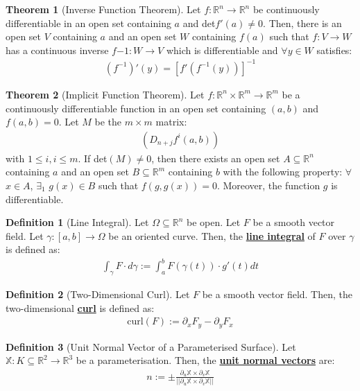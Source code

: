 \documentclass[11pt]{scrartcl}
\newcommand{\R}[0]{\mathbb{R}}
\theoremstyle{definition}
\newtheorem{theorem}{Theorem}
\newtheorem{definition}{Definition}
\theoremstyle{remark}
\newcommand{\dfn}[1]{\textbf{\underline{#1}}}
\newcommand{\idx}[2]{\int_{#1}^{#2}}
\begin{document}
{\begin{theorem}[Inverse Function Theorem]
	Let $f: \R^n \rightarrow \R^n$ be continuously differentiable in an open set containing $a$ and det$f'(a) \neq 0$. Then, there is an open set $V$ containing $a$ and an open set $W$  containing $f(a)$ such that $f: V \rightarrow W$ has a continuous inverse $f{-1}: W \rightarrow V$ which is differentiable and $\forall y \in W$ satisfies: 
	\begin{align}
		(f^{-1})'(y) = [ f'(f^{-1}(y))]^{-1} 	
	\end{align}
\end{theorem}

\begin{theorem}[Implicit Function Theorem]
	Let $f: \R^n \times \R^m \rightarrow \R^m$ be a continuously differentiable function in an open set containing $(a,b)$ and $f(a,b) =0$. Let $M$ be the $m \times m$ matrix: 
	\begin{align*}
		(D_{n+j}f^i (a,b)) 
	\end{align*}
	with $1 \leq i, i \leq m$. If det$(M) \neq 0 $, then there exists an open set $A \subseteq \R^n$ containing $a$ and an open set $B \subseteq \R^m$ containing $b$ with the following property: $\forall$ $ x \in A$, $\exists_1$ $g(x) \in B$ such that $f(g, g(x) ) =0$. Moreover, the function $g$ is differentiable. 
\end{theorem} 	


\begin{definition}[Line Integral]
	Let $\Omega \subseteq \R^n$ be open. Let $F$ be a smooth vector field. Let $\gamma: [a,b] \rightarrow \Omega$ be an oriented curve. Then, the \dfn{line integral} of $F$ over $\gamma$ is defined as: 
	\begin{align*}
		\idx{\gamma}{} F \cdot d\gamma := \idx{a}{b} F(\gamma(t)) \cdot g'(t) dt 
	\end{align*}
\end{definition}

\begin{definition}[Two-Dimensional Curl]
	Let $F$ be a smooth vector field. Then, the two-dimensional \dfn{curl} is defined as: 
	\begin{align*}
		\text{curl} (F) := \partial_x F_y - \partial_y F_x 
	\end{align*}
\end{definition}


\begin{definition}[Unit Normal Vector of a Parameterised Surface] 
	Let $\mathbb{X}: K \subseteq \R^2 \rightarrow \R^3$ be a parameterisation. Then, the \dfn{unit normal vectors} are: 
	\begin{align*}
		n := \pm \frac{\partial_u \mathbb{X} \times \partial_v \mathbb{X}}{|| \partial_u \mathbb{X} \times \partial_v \mathbb{X} ||}
	\end{align*}
\end{definition}

}
\end{document}
